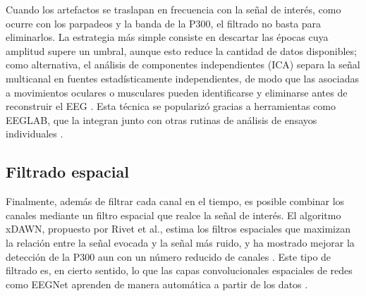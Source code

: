 Cuando los artefactos se traslapan en frecuencia con la señal de interés, como ocurre con los
parpadeos y la banda de la P300, el filtrado no basta para eliminarlos. La estrategia más simple
consiste en descartar las épocas cuya amplitud supere un umbral, aunque esto reduce la cantidad de
datos disponibles; como alternativa, el análisis de componentes independientes (ICA) separa la
señal multicanal en fuentes estadísticamente independientes, de modo que las asociadas a
movimientos oculares o musculares pueden identificarse y eliminarse antes de reconstruir el EEG
\cite{jung2000}. Esta técnica se popularizó gracias a herramientas como EEGLAB, que la integran
junto con otras rutinas de análisis de ensayos individuales \cite{delorme2004}.

\subsection{Filtrado espacial}

Finalmente, además de filtrar cada canal en el tiempo, es posible combinar los canales mediante un
filtro espacial que realce la señal de interés. El algoritmo xDAWN, propuesto por Rivet et al.,
estima los filtros espaciales que maximizan la relación entre la señal evocada y la señal más
ruido, y ha mostrado mejorar la detección de la P300 aun con un número reducido de canales
\cite{rivet2009}. Este tipo de filtrado es, en cierto sentido, lo que las capas convolucionales
espaciales de redes como EEGNet aprenden de manera automática a partir de los datos
\cite{lawhern2018}.
